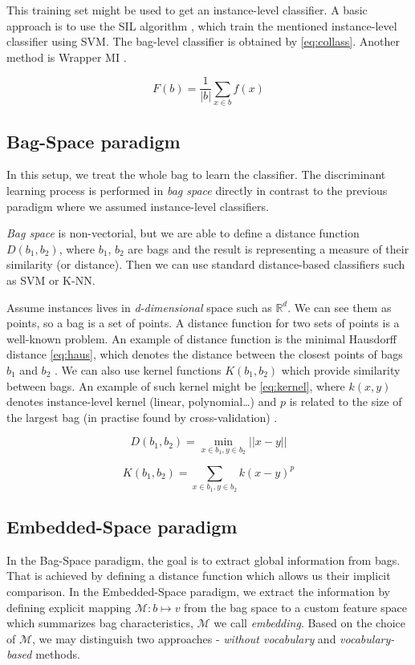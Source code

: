 This training set might be used to get an instance-level classifier. A basic approach is to use the SIL algorithm \cite{Bunescu2007}, which train the mentioned instance-level classifier using SVM. The bag-level classifier is obtained by \ref{eq:collass}. Another method is Wrapper MI \cite{Frank2003}.

\begin{equation} \label{eq:collass}
    F(b)=\frac{1}{|b|}\sum_{x\in b}f(x)
\end{equation}

\subsection{Bag-Space paradigm}
In this setup, we treat the whole bag to learn the classifier. The discriminant learning process is performed in \emph{bag space} directly in contrast to the previous paradigm where we assumed instance-level classifiers.

\emph{Bag space} is non-vectorial, but we are able to define a distance function $D(b_1,b_2)$, where $b_1$, $b_2$ are bags and the result is representing a measure of their similarity (or distance). Then we can use standard distance-based classifiers such as SVM or K-NN.

Assume instances lives in \emph{d-dimensional} space such as $\mathbb{R}^{d}$. We can see them as points, so a bag is a set of points. A distance function for two sets of points is a well-known problem. An example of distance function is the minimal Hausdorff distance \ref{eq:haus}, which denotes the distance between the closest points of bags $b_1$ and $b_2$ \cite{Wang2000}. We can also use kernel functions $K(b_1,b_2)$ which provide similarity between bags. An example of such kernel might be \ref{eq:kernel}, where $k(x,y)$  denotes instance-level kernel (linear, polynomial\dots) and $p$ is related to the size of the largest bag (in practise found by cross-validation) \cite{Gartner2002}.

\begin{equation} \label{eq:haus}
    D(b_1,b_2)=\min_{x\in b_1, y\in b_2}||x-y||
\end{equation}

\begin{equation} \label{eq:kernel}
    K(b_1,b_2)=\sum_{x\in b_1, y\in b_2}k(x-y)^{p}
\end{equation}

\subsection{Embedded-Space paradigm}
In the Bag-Space paradigm, the goal is to extract global information from bags. That is achieved by defining a distance function which allows us their implicit comparison. In the Embedded-Space paradigm, we extract the information by defining explicit mapping $\mathcal{M}:b\mapsto v$ from the bag space to a custom feature space which summarizes bag characteristics,  $\mathcal{M}$ we call \emph{embedding}. Based on the choice of $\mathcal{M}$, we may distinguish two approaches - \emph{without vocabulary} and \emph{vocabulary-based} methods.

